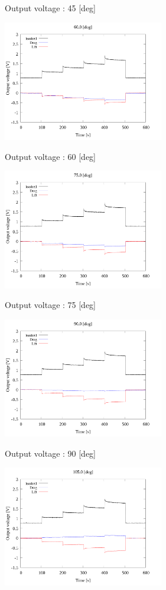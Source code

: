 \begin{multicols}{2}
\begin{figure_here}
\begin{center}
            \caption{Output voltage : 45 [deg]}
            \includegraphics[width=70mm]{../../02_workspace/result/2-1/plot/01-3_allsensors/01_allsensors_600.png}
            \caption{Output voltage : 60 [deg]}
            \includegraphics[width=70mm]{../../02_workspace/result/2-1/plot/01-3_allsensors/01_allsensors_750.png}
            \caption{Output voltage : 75 [deg]}
            \includegraphics[width=70mm]{../../02_workspace/result/2-1/plot/01-3_allsensors/01_allsensors_900.png}
            \caption{Output voltage : 90 [deg]}
            \includegraphics[width=70mm]{../../02_workspace/result/2-1/plot/01-3_allsensors/01_allsensors_1050.png}

\end{center}
\end{figure_here}
\end{multicols}
